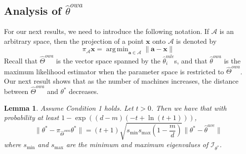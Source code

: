 \documentclass[twoside]{article}
\newtheorem{lemma}{Lemma}
\DeclareMathOperator*{\argmin}{arg\,min}
\newcommand{\smin}{s_\text{min}}
\newcommand{\smax}{s_\text{max}}
\newcommand{\W}{{\hat \Theta^{\textit{owa}}}}
\newcommand{\Wowa}{{\hat \Theta^{\textit{owa}}}}
\newcommand{\A}{\mathcal{A}}
\newcommand{\x}{\mathbf{x}}
\newcommand{\w}{\theta}
\newcommand{\wowa}{\hat\w^{owa}}
\newcommand{\wave}{\hat\w^{ave}}
\newcommand{\wmle}{\hat\w^{mle}}
\newcommand{\wstar}{{\w^{*}}}
\newcommand{\I}{\mathcal I}
\newcommand{\ltwo}[1]{{\lVert {#1} \rVert}}
\newcommand{\proj}[1]{\pi_{{#1}}}
\begin{document}
\subsection {Analysis of $\wowa$}

For our next results, we need to introduce the following notation.
If $\A$ is an arbitrary space,
then the projection of a point $\x$ onto $\A$ is denoted by
\begin{equation}
\proj{\A}\x = \argmin_{\mathbf{a}\in\A} \ltwo{\mathbf{a}-\x}
\end{equation}
Recall that $\W$ is the vector space spanned by the $\wmle_i$s,
and that $\wowa$ is the maximum likelihood estimator when the parameter space is restricted to $\W$.
Our next result shows that as the number of machines increases,
the distance between $\W$ and $\wstar$ decreases.

\begin{lemma}
Assume Condition 1 holds.
Let $t>0$.
Then we have that with probability at least $1-\exp((d-m)(-t+\ln(t+1)))$,
\begin{equation}
\ltwo{\wstar-\proj\W\wstar}
=
(t+1)\sqrt{\smin\smax\left(1-\frac{m}{d}\right)}\ltwo{\wstar - \wave}
\end{equation}
where $\smin$ and $\smax$ are the minimum and maximum eigenvalues of $\I_\wstar$.
\end{lemma}
\end{document}

